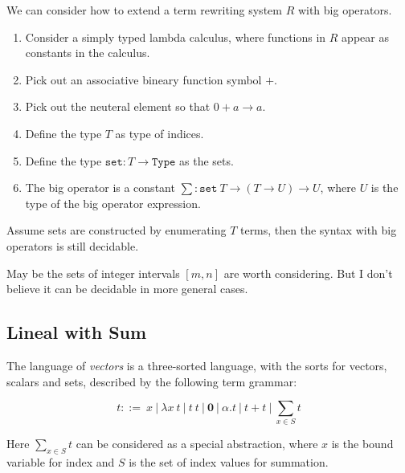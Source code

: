 \begin{example}
  We can consider how to extend a term rewriting system $R$ with big operators.

  \begin{enumerate}
    \item Consider a simply typed lambda calculus, where functions in $R$ appear as constants in the calculus.
    \item Pick out an associative bineary function symbol $+$.
    \item Pick out the neuteral element so that $0 + a \to a$.
    \item Define the type $T$ as type of indices.
    \item Define the type $\texttt{set} : T \to \texttt{Type}$ as the sets.
    \item The big operator is a constant $\sum : \texttt{set}\ T \to (T \to U) \to U$, where $U$ is the type of the big operator expression.
  \end{enumerate}
\end{example}


\begin{example}
  Assume sets are constructed by enumerating $T$ terms, then the syntax with big operators is still decidable.
\end{example}

May be the sets of integer intervals $[m, n]$ are worth considering. But I don't believe it can be decidable in more general cases.



\subsection{Lineal with Sum}

The language of \textit{vectors} is a three-sorted language, with the sorts for vectors, scalars and sets, described by the following term grammar:

$$
t ::=\ x\ |\ \lambda x\ t\ |\ t\ t\ |\ \mathbf{0}\ |\ \alpha.t\ |\ t + t\ |\ \sum_{x \in S} t
$$

Here $\sum_{x \in S} t$ can be considered as a special abstraction, where $x$ is the bound variable for index and $S$ is the set of index values for summation.


